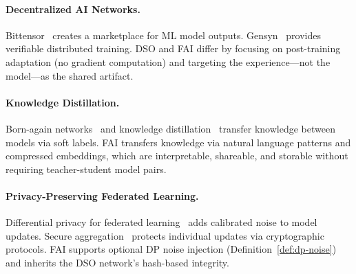\paragraph{Decentralized AI Networks.}
Bittensor~\cite{bittensor2023} creates a marketplace for ML model outputs.
Gensyn~\cite{gensyn2023} provides verifiable distributed training. DSO
and FAI differ by focusing on post-training adaptation (no gradient
computation) and targeting the experience---not the model---as the shared artifact.

\paragraph{Knowledge Distillation.}
Born-again networks~\cite{furlanello2018born} and knowledge
distillation~\cite{hinton2015distilling} transfer knowledge between models
via soft labels. FAI transfers knowledge via natural language patterns and
compressed embeddings, which are interpretable, shareable, and storable
without requiring teacher-student model pairs.

\paragraph{Privacy-Preserving Federated Learning.}
Differential privacy for federated learning~\cite{mcmahan2018learning}
adds calibrated noise to model updates. Secure aggregation~\cite{bonawitz2017practical}
protects individual updates via cryptographic protocols. FAI supports
optional DP noise injection (Definition~\ref{def:dp-noise}) and inherits
the DSO network's hash-based integrity.

